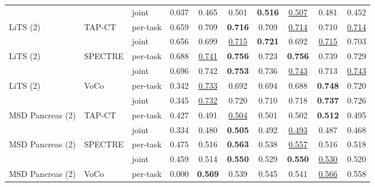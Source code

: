 \begin{tabular}{lllccccccc}
 &  & joint & \cellcolor{modebest}0.037 & 0.465 & 0.501 & \cellcolor{modebest}\textbf{0.516} & \cellcolor{modebest}\underline{0.507} & 0.481 & 0.452 \\
\addlinespace[2pt]
LiTS (2) & TAP-CT & per-task & \cellcolor{modebest}0.659 & \cellcolor{modebest}0.709 & \cellcolor{modebest}\textbf{0.716} & 0.709 & \cellcolor{modebest}\underline{0.714} & 0.710 & \cellcolor{modebest}\underline{0.714} \\
 &  & joint & 0.656 & 0.699 & \underline{0.715} & \cellcolor{modebest}\textbf{0.721} & 0.692 & \cellcolor{modebest}\underline{0.715} & 0.703 \\
\addlinespace[2pt]
LiTS (2) & SPECTRE & per-task & 0.688 & \underline{0.741} & \cellcolor{modebest}\textbf{0.756} & 0.723 & \cellcolor{modebest}\textbf{0.756} & \cellcolor{modebest}0.739 & 0.729 \\
 &  & joint & \cellcolor{modebest}0.696 & \cellcolor{modebest}0.742 & \textbf{0.753} & \cellcolor{modebest}0.736 & \underline{0.743} & 0.713 & \cellcolor{modebest}\underline{0.743} \\
\addlinespace[2pt]
LiTS (2) & VoCo & per-task & 0.342 & \cellcolor{modebest}\underline{0.733} & 0.692 & 0.694 & 0.688 & \cellcolor{modebest}\textbf{0.748} & 0.720 \\
 &  & joint & \cellcolor{modebest}0.345 & \underline{0.732} & \cellcolor{modebest}0.720 & \cellcolor{modebest}0.710 & \cellcolor{modebest}0.718 & \textbf{0.737} & \cellcolor{modebest}0.726 \\
\addlinespace[2pt]
MSD Pancreas (2) & TAP-CT & per-task & \cellcolor{modebest}0.427 & \cellcolor{modebest}0.491 & \underline{0.504} & \cellcolor{modebest}0.501 & \cellcolor{modebest}0.502 & \cellcolor{modebest}\textbf{0.512} & \cellcolor{modebest}0.495 \\
 &  & joint & 0.334 & 0.480 & \cellcolor{modebest}\textbf{0.505} & 0.492 & \underline{0.493} & 0.487 & 0.468 \\
\addlinespace[2pt]
MSD Pancreas (2) & SPECTRE & per-task & \cellcolor{modebest}0.475 & \cellcolor{modebest}0.516 & \cellcolor{modebest}\textbf{0.563} & \cellcolor{modebest}0.538 & \cellcolor{modebest}\underline{0.557} & 0.516 & 0.518 \\
 &  & joint & 0.459 & 0.514 & \textbf{0.550} & 0.529 & \textbf{0.550} & \cellcolor{modebest}\underline{0.530} & \cellcolor{modebest}0.520 \\
\addlinespace[2pt]
MSD Pancreas (2) & VoCo & per-task & 0.000 & \cellcolor{modebest}\textbf{0.569} & 0.539 & 0.545 & 0.541 & \cellcolor{modebest}\underline{0.566} & 0.558 \\

\end{tabular}
